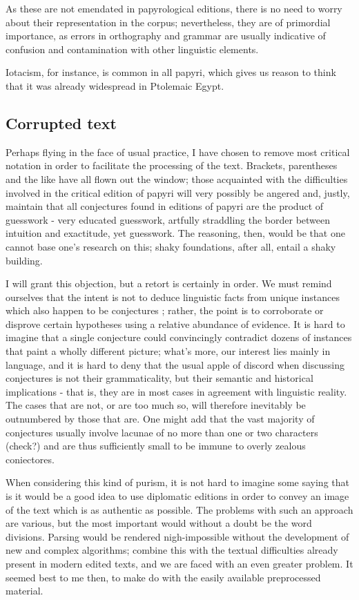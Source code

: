 As these are not emendated in papyrological editions, there is no need to worry
about their representation in the corpus; nevertheless, they are of primordial
importance, as errors in orthography and grammar are usually indicative of
confusion and contamination with other linguistic elements.

Iotacism, for instance, is common in all papyri, which gives us reason to think
that it was already widespread in Ptolemaic Egypt.

\subsection{Corrupted text}
\label{subsect:corruptedtext}

Perhaps flying in the face of usual practice, I have chosen to remove most
critical notation in order to facilitate the processing of the text. Brackets,
parentheses and the like have all flown out the window; those acquainted with
the difficulties involved in the critical edition of papyri will very possibly
be angered and, justly, maintain that all conjectures found in editions of
papyri are the product of guesswork - very educated guesswork, artfully
straddling the border between intuition and exactitude, yet guesswork. The
reasoning, then, would be that one cannot base one's research on this; shaky
foundations, after all, entail a shaky building.

I will grant this objection, but a retort is certainly in order. We must remind
ourselves that the intent is not to deduce linguistic facts from unique
instances which also happen to be conjectures ; rather, the point is to
corroborate or disprove certain hypotheses using a relative abundance of
evidence. It is hard to imagine that a single conjecture could convincingly
contradict dozens of instances that paint a wholly different picture; what's
more, our interest lies mainly in language, and it is hard to deny that the
usual apple of discord when discussing conjectures is not their grammaticality,
but their semantic and historical implications - that is, they are in most
cases in agreement with linguistic reality. The cases that are not, or are too
much so, will therefore inevitably be outnumbered by those that are. One might
add that the vast majority of conjectures usually involve lacunae of no more
than one or two characters (check?) and are thus sufficiently small to be
immune to overly zealous coniectores.

When considering this kind of purism, it is not hard to imagine some saying
that is it would be a good idea to use diplomatic editions in order to convey
an image of the text which is as authentic as possible.  The problems with such
an approach are various, but the most important would without a doubt be the
word divisions. Parsing would be rendered nigh-impossible without the
development of new and complex algorithms; combine this with the textual
difficulties already present in modern edited texts, and we are faced with an
even greater problem. It seemed best to me then, to make do with the easily
available preprocessed material.

